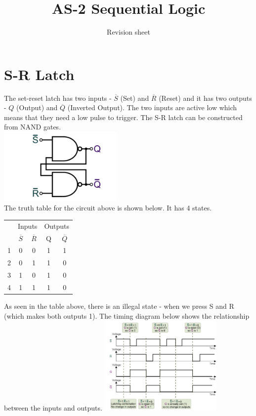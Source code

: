 \documentclass[a4paper,11pt, twocolumn]{article}
\title{AS-2 Sequential Logic}
\author{Revision sheet}
\date{}
\begin{document}
\maketitle
\thispagestyle{fancy}

\section{S-R Latch}
The set-reset latch has two inputs - $\overline{S}$ (Set) and $\overline{R}$ (Reset) and it has two outputs - $Q$ (Output) and $\overline{Q}$ (Inverted Output). The two inputs are active low which means that they need a low pulse to trigger. The S-R latch can be constructed from NAND gates.\\
\includegraphics[width=0.45\textwidth]{srLatch.jpg}\\
The truth table for the circuit above is shown below. It has 4 states.
\begin{table}[H]
    \centering
    \begin{tabular}{l|cc|cc}
     & \multicolumn{2}{c}{Inputs} & \multicolumn{2}{c}{Outputs} \\
     & $\overline{S}$ & $\overline{R}$ & Q & $\overline{Q}$ \\
     \hline
    1 & 0 & 0 & 1 & 1 \\
    2 & 0 & 1 & 1 & 0 \\
    3 & 1 & 0 & 1 & 0 \\
    4 & 1 & 1 & 1 & 0
    \end{tabular}
\end{table}
\noindent As seen in the table above, there is an illegal state - when we press S and R (which makes both outputs 1). The timing diagram below shows the relationship between the inputs and outputs.
\includegraphics[width=0.45\textwidth]{srTiming.jpg}
\end{document}
